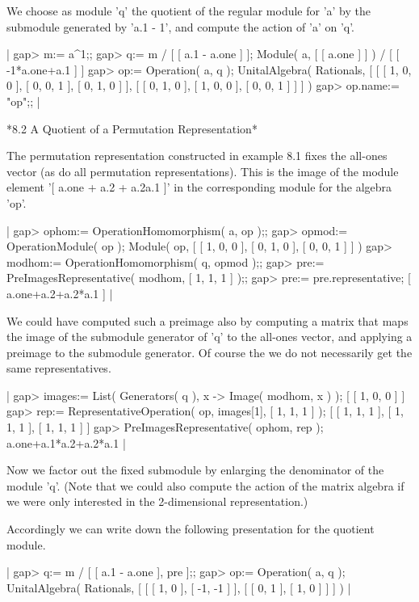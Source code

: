 We choose as module 'q' the quotient of the regular module for 'a'
by the submodule generated by 'a.1 - 1', and compute the action of 'a'
on 'q'.

|    gap> m:= a^1;;
    gap> q:= m / [ [ a.1 - a.one ] ];
    Module( a, [ [ a.one ] ] ) / [ [ -1*a.one+a.1 ] ]
    gap> op:= Operation( a, q );
    UnitalAlgebra( Rationals, 
    [ [ [ 1, 0, 0 ], [ 0, 0, 1 ], [ 0, 1, 0 ] ], 
      [ [ 0, 1, 0 ], [ 1, 0, 0 ], [ 0, 0, 1 ] ] ] )
    gap> op.name:= "op";; |
    
\vspace{5mm}

*8.2 A Quotient of a Permutation Representation*

The permutation representation constructed in example 8.1 fixes the all-ones
vector (as do all permutation representations).  This is the image of the
module element '[ a.one + a.2 + a.2\*a.1 ]' in the corresponding module for
the algebra 'op'.

|    gap> ophom:= OperationHomomorphism( a, op );;
    gap> opmod:= OperationModule( op );
    Module( op, [ [ 1, 0, 0 ], [ 0, 1, 0 ], [ 0, 0, 1 ] ] )
    gap> modhom:= OperationHomomorphism( q, opmod );;
    gap> pre:= PreImagesRepresentative( modhom, [ 1, 1, 1 ] );;
    gap> pre:= pre.representative;
    [ a.one+a.2+a.2*a.1 ] |

We could have computed such a preimage also by computing a matrix that maps
the image of the submodule generator of 'q' to the all-ones vector, and
applying a preimage to the submodule generator.  Of course the we do not
necessarily get the same representatives.
    
|    gap> images:= List( Generators( q ), x -> Image( modhom, x ) );
    [ [ 1, 0, 0 ] ]
    gap> rep:= RepresentativeOperation( op, images[1], [ 1, 1, 1 ] );
    [ [ 1, 1, 1 ], [ 1, 1, 1 ], [ 1, 1, 1 ] ]
    gap> PreImagesRepresentative( ophom, rep );
    a.one+a.1*a.2+a.2*a.1 |
    
Now we factor out the fixed submodule by enlarging the denominator of
the module 'q'.  (Note that we could also compute the action of the matrix
algebra if we were only interested in the 2-dimensional representation.)

Accordingly we can write down the following presentation for the
quotient module.

|    gap> q:= m / [ [ a.1 - a.one ], pre ];;
    gap> op:= Operation( a, q );
    UnitalAlgebra( Rationals, 
    [ [ [ 1, 0 ], [ -1, -1 ] ], [ [ 0, 1 ], [ 1, 0 ] ] ] ) |
    
